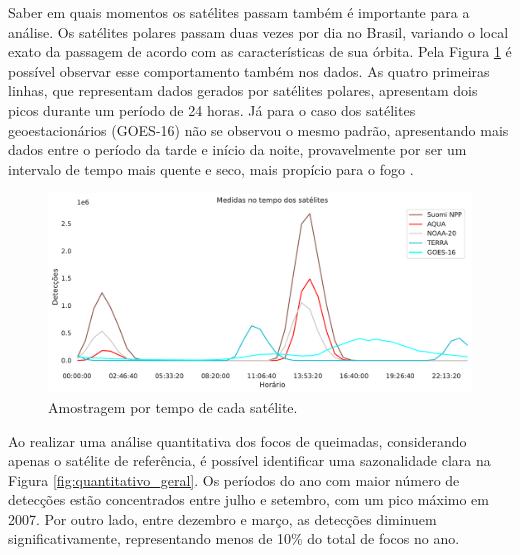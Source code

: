 \documentclass[cic,tc]{iiufrgs}
\begin{document}
Saber em quais momentos os satélites passam também é importante para a análise. Os satélites polares passam duas vezes por dia no Brasil, variando o local exato da passagem de acordo com as características de sua órbita. Pela Figura \ref{fig:tempo_medidas_satelites} é possível observar esse comportamento também nos dados. As quatro primeiras linhas, que representam dados gerados por satélites polares, apresentam dois picos durante um período de 24 horas. Já para o caso dos satélites geoestacionários (GOES-16) não se observou o mesmo padrão, apresentando mais dados entre o período da tarde e início da noite, provavelmente por ser um intervalo de tempo mais quente e seco, mais propício para o fogo \citep{nepstad2007mortality}.

\begin{figure}[!htb]
    \caption{Amostragem por tempo de cada satélite.}
    \begin{center}
        \includegraphics[width=35em]{tempo_medidas_satelites}
    \end{center}
    \label{fig:tempo_medidas_satelites}
\end{figure}

Ao realizar uma análise quantitativa dos focos de queimadas, considerando apenas o satélite de referência, é possível identificar uma sazonalidade clara na Figura \ref{fig:quantitativo_geral}. Os períodos do ano com maior número de detecções estão concentrados entre julho e setembro, com um pico máximo em 2007. Por outro lado, entre dezembro e março, as detecções diminuem significativamente, representando menos de 10\% do total de focos no ano.
\end{document}
